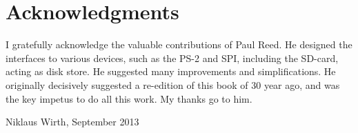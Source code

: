 \clearpage\section*{Acknowledgments}
I gratefully acknowledge the valuable contributions of Paul Reed. He designed the interfaces to
various devices, such as the PS-2 and SPI, including the SD-card, acting as disk store. He
suggested many improvements and simplifications. He originally decisively suggested a re-edition
of this book of 30 year ago, and was the key impetus to do all this work. My thanks go to him.
\begin{flushright}
  Niklaus Wirth, September 2013
\end{flushright}
